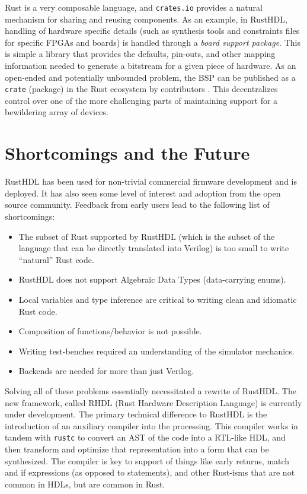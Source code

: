 \documentclass[sigplan,screen,sigconf]{acmart}
\begin{document}
Rust is a very composable language, and \verb|crates.io| provides a natural mechanism
for sharing and reusing components.  As an example, in RustHDL, handling of hardware specific
details (such as synthesis tools and constraints files for specific FPGAs and boards) is 
handled through a \emph{board support package}.  This is simple a library that provides the
defaults, pin-outs, and other mapping information needed to generate a bitstream for a given piece of
hardware.  As an open-ended and potentially unbounded problem, the BSP can be published as
a \verb|crate| (package) in the Rust ecosystem by contributors \cite{b7}.  This decentralizes control
over one of the more challenging parts of maintaining support for a bewildering array of 
devices. 

\section{Shortcomings and the Future}
RustHDL has been used for non-trivial commercial firmware development and is deployed.  It has also seen 
some level of interest and adoption from the open source community.  Feedback from early users 
lead to the following list of shortcomings:

\begin{itemize}
  \item The subset of Rust supported by RustHDL (which is the subset of the language that can be 
  directly translated into Verilog) is too small to write ``natural'' Rust code. 
  \item RustHDL does not support Algebraic Data Types (data-carrying enums).
  \item Local variables and type inference are critical to writing clean and
  idiomatic Rust code.  
  \item Composition of functions/behavior is not possible. 
  \item Writing test-benches required an understanding of the simulator mechanics.
  \item Backends are needed for more than just Verilog.
\end{itemize}

Solving all of these problems essentially necessitated a rewrite of RustHDL.  The new framework,
called RHDL (Rust Hardware Description Language) is currently under development.  The primary
technical difference to RustHDL is the introduction of an auxiliary compiler into the processing.
This compiler works in tandem with \verb|rustc| to convert an AST of the code into a RTL-like
HDL, and then transform and optimize that representation into a form that can be synthesized.  The 
compiler is key to support of things like early returns, match and if expressions (as opposed to statements),
and other Rust-isms that are not common in HDLs, but are common in Rust.  
\end{document}
